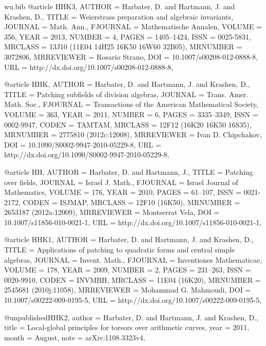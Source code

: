 \documentclass{amsart}
\numberwithin{equation}{section}
\theoremstyle{plain}
\theoremstyle{definition}
\begin{document}
\begin{filecontents}{wu.bib}
@article {HHK3, 
    AUTHOR = {Harbater, D. and Hartmann, J. and Krashen, D.},
     TITLE = {Weierstrass preparation and algebraic invariants},
   JOURNAL = {Math. Ann.},
  FJOURNAL = {Mathematische Annalen},
    VOLUME = {356},
      YEAR = {2013},
    NUMBER = {4},
     PAGES = {1405--1424},
      ISSN = {0025-5831},
   MRCLASS = {13J10 (11E04 14H25 16K50 16W60 32B05)},
  MRNUMBER = {3072806},
MRREVIEWER = {Rosario Strano},
       DOI = {10.1007/s00208-012-0888-8},
       URL = {http://dx.doi.org/10.1007/s00208-012-0888-8},
}

@article {HHK, 
    AUTHOR = {Harbater, D. and Hartmann, J. and Krashen, D.},
     TITLE = {Patching subfields of division algebras},
   JOURNAL = {Trans. Amer. Math. Soc.},
  FJOURNAL = {Transactions of the American Mathematical Society},
    VOLUME = {363},
      YEAR = {2011},
    NUMBER = {6},
     PAGES = {3335--3349},
      ISSN = {0002-9947},
     CODEN = {TAMTAM},
   MRCLASS = {12F12 (16K20 16K50 16S35)},
  MRNUMBER = {2775810 (2012c:12008)},
MRREVIEWER = {Ivan D. Chipchakov},
       DOI = {10.1090/S0002-9947-2010-05229-8},
       URL = {http://dx.doi.org/10.1090/S0002-9947-2010-05229-8},
}

@article {HH, 
    AUTHOR = {Harbater, D. and Hartmann, J.},
     TITLE = {Patching over fields},
   JOURNAL = {Israel J. Math.},
  FJOURNAL = {Israel Journal of Mathematics},
    VOLUME = {176},
      YEAR = {2010},
     PAGES = {61--107},
      ISSN = {0021-2172},
     CODEN = {ISJMAP},
   MRCLASS = {12F10 (16K50)},
  MRNUMBER = {2653187 (2012a:12009)},
MRREVIEWER = {Montserrat Vela},
       DOI = {10.1007/s11856-010-0021-1},
       URL = {http://dx.doi.org/10.1007/s11856-010-0021-1},
}

@article {HHK1, 
    AUTHOR = {Harbater, D. and Hartmann, J. and Krashen, D.},
     TITLE = {Applications of patching to quadratic forms and central simple
              algebras},
   JOURNAL = {Invent. Math.},
  FJOURNAL = {Inventiones Mathematicae},
    VOLUME = {178},
      YEAR = {2009},
    NUMBER = {2},
     PAGES = {231--263},
      ISSN = {0020-9910},
     CODEN = {INVMBH},
   MRCLASS = {11E04 (16K20)},
  MRNUMBER = {2545681 (2010j:11058)},
MRREVIEWER = {Mohammad G. Mahmoudi},
       DOI = {10.1007/s00222-009-0195-5},
       URL = {http://dx.doi.org/10.1007/s00222-009-0195-5},
}

@unpublished{HHK2,
	author	= {Harbater, D. and Hartmann, J. and Krashen, D.},
	title	= {Local-global principles for torsors over arithmetic curves},
	year	= {2011},
	month	= {August},
	note	= {arXiv:1108.3323v4},
}



\end{filecontents}
\end{document}
